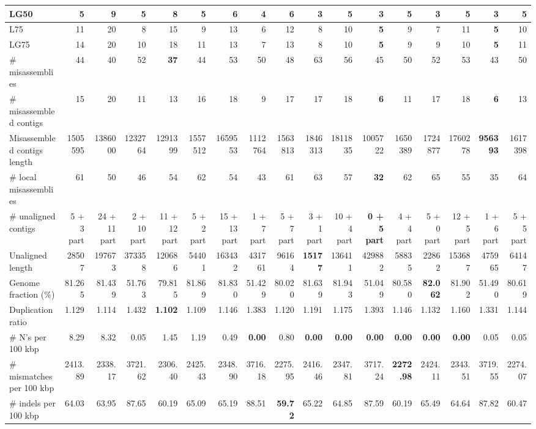 \documentclass[12pt,a4paper]{article}
\begin{document}
\begin{table}[ht]
\begin{center}
\begin{tabular}{|l*{16}{|r}|}
LG50 & 5 & 9 & 5 & 8 & 5 & 6 & 4 & 6 & {\bf 3} & 5 & {\bf 3} & 5 & {\bf 3} & 5 & {\bf 3} & 5 \\ \hline
L75 & 11 & 20 & 8 & 15 & 9 & 13 & 6 & 12 & 8 & 10 & {\bf 5} & 9 & 7 & 11 & {\bf 5} & 10 \\ \hline
LG75 & 14 & 20 & 10 & 18 & 11 & 13 & 7 & 13 & 8 & 10 & {\bf 5} & 9 & 9 & 10 & {\bf 5} & 11 \\ \hline
\# misassemblies & 44 & 40 & 52 & {\bf 37} & 44 & 53 & 50 & 48 & 63 & 56 & 45 & 50 & 52 & 53 & 43 & 50 \\ \hline
\# misassembled contigs & 15 & 20 & 11 & 13 & 16 & 18 & 9 & 17 & 17 & 18 & {\bf 6} & 11 & 17 & 18 & {\bf 6} & 13 \\ \hline
Misassembled contigs length & 1505595 & 1386000 & 1232764 & 1291399 & 1557512 & 1659553 & 1112764 & 1563813 & 1846313 & 1811835 & 1005722 & 1650389 & 1724877 & 1760278 & {\bf 956393} & 1617398 \\ \hline
\# local misassemblies & 61 & 50 & 46 & 54 & 62 & 54 & 43 & 61 & 63 & 57 & {\bf 32} & 62 & 65 & 55 & 35 & 64 \\ \hline
\# unaligned contigs & 5 + 3 part & 24 + 11 part & 2 + 10 part & 11 + 12 part & 5 + 2 part & 15 + 13 part & 1 + 7 part & 5 + 7 part & 3 + 1 part & 10 + 4 part & {\bf 0 + 5 part} & 4 + 4 part & 5 + 0 part & 12 + 5 part & 1 + 6 part & 5 + 5 part \\ \hline
Unaligned length & 28507 & 197673 & 373358 & 120686 & 54401 & 163432 & 431761 & 96164 & {\bf 15177} & 136411 & 429882 & 58835 & 22862 & 153687 & 475965 & 64147 \\ \hline
Genome fraction (\%) & 81.265 & 81.439 & 51.763 & 79.815 & 81.869 & 81.830 & 51.429 & 80.020 & 81.639 & 81.943 & 51.049 & 80.580 & {\bf 82.062} & 81.902 & 51.490 & 80.619 \\ \hline
Duplication ratio & 1.129 & 1.114 & 1.432 & {\bf 1.102} & 1.109 & 1.146 & 1.383 & 1.120 & 1.191 & 1.175 & 1.393 & 1.146 & 1.132 & 1.160 & 1.331 & 1.144 \\ \hline
\# N's per 100 kbp & 8.29 & 8.32 & 0.05 & 1.45 & 1.19 & 0.49 & {\bf 0.00} & 0.80 & {\bf 0.00} & {\bf 0.00} & {\bf 0.00} & {\bf 0.00} & {\bf 0.00} & {\bf 0.00} & 0.05 & 0.05 \\ \hline
\# mismatches per 100 kbp & 2413.89 & 2338.17 & 3721.62 & 2306.40 & 2425.43 & 2348.90 & 3716.18 & 2275.95 & 2416.46 & 2347.81 & 3717.24 & {\bf 2272.98} & 2424.11 & 2343.51 & 3719.55 & 2274.07 \\ \hline
\# indels per 100 kbp & 64.03 & 63.95 & 87.65 & 60.19 & 65.09 & 65.19 & 88.51 & {\bf 59.72} & 65.22 & 64.85 & 87.59 & 60.19 & 65.49 & 64.64 & 87.82 & 60.47 \\ \hline

\end{tabular}
\end{center}
\end{table}
\end{document}
